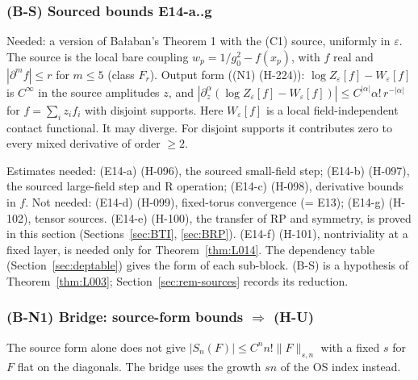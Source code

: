 \subsubsection{(B-S) Sourced bounds E14-a..g}\label{sec:BS}
Needed: a version of Ba{\l}aban's Theorem 1 with the (C1) source, uniformly in $\varepsilon$. The source is the local bare coupling $w_p=1/g_0^2-f(x_p)$, with $f$ real and $|\partial^mf|\le r$ for $m\le5$ (class $F_r$). Output form ((N1) (H-224)): $\log Z_\varepsilon[f]-W_\varepsilon[f]$ is $C^\infty$ in the source amplitudes $z$, and $|\partial_z^\alpha(\log Z_\varepsilon[f]-W_\varepsilon[f])|\le C^{|\alpha|}\alpha!\,r^{-|\alpha|}$ for $f=\sum_iz_if_i$ with disjoint supports. Here $W_\varepsilon[f]$ is a local field-independent contact functional. It may diverge. For disjoint supports it contributes zero to every mixed derivative of order $\ge2$.

Estimates needed: (E14-a) (H-096), the sourced small-field step; (E14-b) (H-097), the sourced large-field step and R operation; (E14-c) (H-098), derivative bounds in $f$. Not needed: (E14-d) (H-099), fixed-torus convergence (= E13); (E14-g) (H-102), tensor sources. (E14-e) (H-100), the transfer of RP and symmetry, is proved in this section (Sections~\ref{sec:BTI}, \ref{sec:BRP}). (E14-f) (H-101), nontriviality at a fixed layer, is needed only for Theorem~\ref{thm:L014}. The dependency table (Section~\ref{sec:deptable}) gives the form of each sub-block. (B-S) is a hypothesis of Theorem~\ref{thm:L003}; Section~\ref{sec:rem-sources} records its reduction.

\subsubsection{(B-N1) Bridge: source-form bounds $\Rightarrow$ (H-U)}\label{sec:BN1}
The source form alone does not give $|S_n(F)|\le C^nn!\|F\|_{s,n}$ with a fixed $s$ for $F$ flat on the diagonals. The bridge uses the growth $sn$ of the OS index instead.

